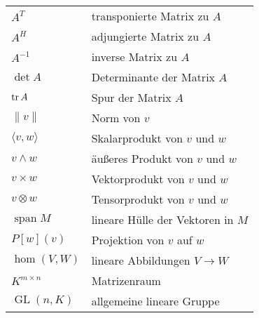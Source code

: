 \vspace{0.8em}\noindent
{}\\
\begin{tabular}{@{}ll}
$A^T$ & transponierte Matrix zu $A$\\
$A^H$ & adjungierte Matrix zu $A$\\
$A^{-1}$ & inverse Matrix zu $A$\\
$\det A$ & Determinante der Matrix $A$\\
$\operatorname{tr} A$ & Spur der Matrix $A$\\
$\|v\|$ & Norm von $v$\\
$\langle v,w\rangle$ & Skalarprodukt von $v$ und $w$\\
$v\wedge w$ & äußeres Produkt von $v$ und $w$\\
$v\times w$ & Vektorprodukt von $v$ und $w$\\
$v\otimes w$ & Tensorprodukt von $v$ und $w$\\
$\operatorname{span} M$ & lineare Hülle der Vektoren in $M$\\
$P[w](v)$ & Projektion von $v$ auf $w$\\
$\hom(V,W)$ & lineare Abbildungen $V\to W$\\
$K^{m\times n}$ & Matrizenraum\\
$\operatorname{GL}(n,K)$ & allgemeine lineare Gruppe
\end{tabular}
